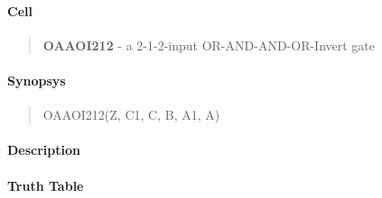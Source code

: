 \label{OAAOI212}
\paragraph{Cell}
\begin{quote}
    \textbf{OAAOI212} - a 2-1-2-input OR-AND-AND-OR-Invert gate
\end{quote}

\paragraph{Synopsys}
\begin{quote}
    OAAOI212(Z, C1, C, B, A1, A)
\end{quote}

\paragraph{Description}

%

\paragraph{Truth Table}
%

